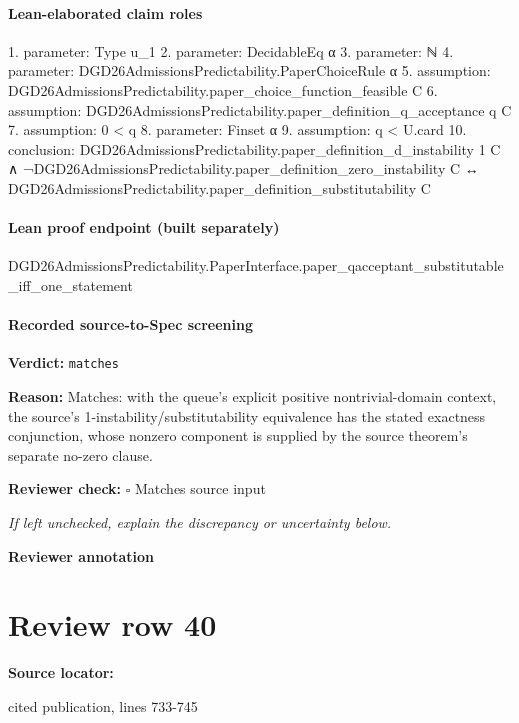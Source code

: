 \documentclass[10pt]{article}
\newcommand{\reviewerbox}{%
  \par\noindent\fbox{\parbox{0.96\linewidth}{\rule{0pt}{0.38in}}}\par
}
\newcommand{\reviewmatch}[1]{%
  \par\noindent\textbf{Reviewer check:} $\square$\; #1\par
  \noindent\emph{If left unchecked, explain the discrepancy or uncertainty below.}\par
}
\begin{document}
\paragraph{Lean-elaborated claim roles}\begin{ReviewVerbatim}
1. parameter: Type u_1
2. parameter: DecidableEq α
3. parameter: ℕ
4. parameter: DGD26AdmissionsPredictability.PaperChoiceRule α
5. assumption: DGD26AdmissionsPredictability.paper_choice_function_feasible C
6. assumption: DGD26AdmissionsPredictability.paper_definition_q_acceptance q C
7. assumption: 0 < q
8. parameter: Finset α
9. assumption: q < U.card
10. conclusion: DGD26AdmissionsPredictability.paper_definition_d_instability 1 C ∧
    ¬DGD26AdmissionsPredictability.paper_definition_zero_instability C ↔
  DGD26AdmissionsPredictability.paper_definition_substitutability C
\end{ReviewVerbatim}

\paragraph{Lean proof endpoint (built separately)}\begin{ReviewVerbatim}
DGD26AdmissionsPredictability.PaperInterface.paper_qacceptant_substitutable_iff_one_statement
\end{ReviewVerbatim}

\paragraph{Recorded source-to-Spec screening}
\textbf{Verdict:} \texttt{matches}
\\
{\raggedright
\textbf{Reason:} Matches:\allowbreak{} with the queue's explicit positive nontrivial-\allowbreak{}domain context, the source's 1-\allowbreak{}instability/\allowbreak{}substitutability equivalence has the stated exactness conjunction, whose nonzero component is supplied by the source theorem's separate no-\allowbreak{}zero clause.\allowbreak{}
\par}
\reviewmatch{Matches source input}
\noindent\textbf{Reviewer annotation}\par
\reviewerbox
\clearpage
\hypertarget{source-claim-b564e283fe9ce18d}{}
\section*{Review row 40}
\textbf{Source locator:} {\footnotesize\raggedright cited publication, lines 733-\allowbreak{}745\par}
\end{document}
